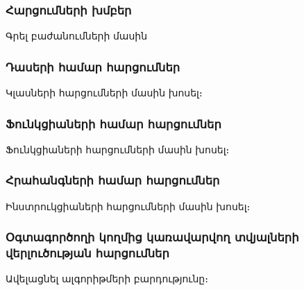 {
    \subsubsection{Հարցումների խմբեր}\label{subsubsec:queryGroups}
    Գրել բաժանումների մասին

    \subsubsection*{Դասերի համար հարցումներ}\label{subsubsec:classes}
    Կլասների հարցումների մասին խոսել։

    \subsubsection*{Ֆունկցիաների համար հարցումներ}\label{subsubsec:functions}
    Ֆունկցիաների հարցումների մասին խոսել։

    \subsubsection*{Հրահանգների համար հարցումներ}\label{subsubsec:instructions}
    Ինստրուկցիաների հարցումների մասին խոսել։

    \subsubsection*{Օգտագործողի կողմից կառավարվող տվյալների վերլուծության հարցումներ}\label{subsubsec:taintAnalisys}
    Ավելացնել ալգորիթմերի բարդությունը։
}